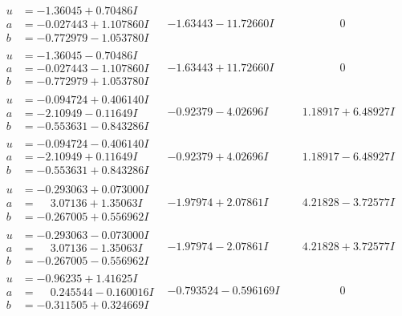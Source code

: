 \documentclass[1p]{elsarticle_modified}
\theoremstyle{definition}
\begin{document}
$$\begin{array}{c|c|c}
\begin{aligned}
u &= -1.36045 + 0.70486 I \\
a &= -0.027443 + 1.107860 I \\
b &= -0.772979 - 1.053780 I\end{aligned}
 & -1.63443 - 11.72660 I & \phantom{-0.000000 } 0 \\ \hline\begin{aligned}
u &= -1.36045 - 0.70486 I \\
a &= -0.027443 - 1.107860 I \\
b &= -0.772979 + 1.053780 I\end{aligned}
 & -1.63443 + 11.72660 I & \phantom{-0.000000 } 0 \\ \hline\begin{aligned}
u &= -0.094724 + 0.406140 I \\
a &= -2.10949 - 0.11649 I \\
b &= -0.553631 - 0.843286 I\end{aligned}
 & -0.92379 - 4.02696 I & \phantom{-}1.18917 + 6.48927 I \\ \hline\begin{aligned}
u &= -0.094724 - 0.406140 I \\
a &= -2.10949 + 0.11649 I \\
b &= -0.553631 + 0.843286 I\end{aligned}
 & -0.92379 + 4.02696 I & \phantom{-}1.18917 - 6.48927 I \\ \hline\begin{aligned}
u &= -0.293063 + 0.073000 I \\
a &= \phantom{-}3.07136 + 1.35063 I \\
b &= -0.267005 + 0.556962 I\end{aligned}
 & -1.97974 + 2.07861 I & \phantom{-}4.21828 - 3.72577 I \\ \hline\begin{aligned}
u &= -0.293063 - 0.073000 I \\
a &= \phantom{-}3.07136 - 1.35063 I \\
b &= -0.267005 - 0.556962 I\end{aligned}
 & -1.97974 - 2.07861 I & \phantom{-}4.21828 + 3.72577 I \\ \hline\begin{aligned}
u &= -0.96235 + 1.41625 I \\
a &= \phantom{-}0.245544 - 0.160016 I \\
b &= -0.311505 + 0.324669 I\end{aligned}
 & -0.793524 - 0.596169 I & \phantom{-0.000000 } 0 \\ \hline\begin{aligned}

\end{aligned}
\end{array}$$
\end{document}
